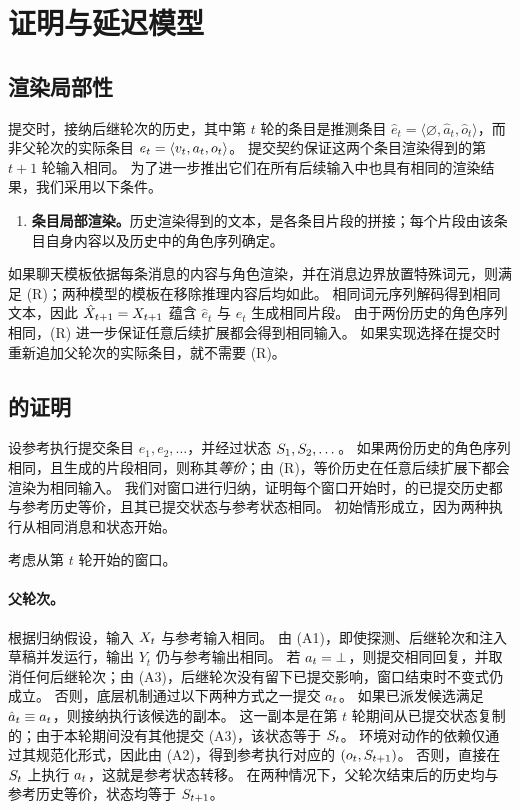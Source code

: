 \section{证明与延迟模型}
\label{app:proofs}

\subsection{渲染局部性}
\label{app:proofs:locality}

提交时，\method 接纳后继轮次的历史，其中第 $t$ 轮的条目是推测条目 $\hat e_t=\langle\varnothing,\hat a_t,\hat o_t\rangle$，而非父轮次的实际条目 $e_t=\langle v_{t},a_{t},o_{t}\rangle$。
提交契约保证这两个条目渲染得到的第 $t{+}1$ 轮输入相同。
为了进一步推出它们在所有后续输入中也具有相同的渲染结果，我们采用以下条件。

\begin{enumerate}[label=(R),leftmargin=*,nosep]
\item \textbf{条目局部渲染。}历史渲染得到的文本，是各条目片段的拼接；每个片段由该条目自身内容以及历史中的角色序列确定。
\end{enumerate}

如果聊天模板依据每条消息的内容与角色渲染，并在消息边界放置特殊词元，则满足 (R)；两种模型的模板在移除推理内容后均如此。
相同词元序列解码得到相同文本，因此 $\hat X_{t+1}=X_{t+1}$ 蕴含 $\hat e_t$ 与 $e_t$ 生成相同片段。
由于两份历史的角色序列相同，(R) 进一步保证任意后续扩展都会得到相同输入。
如果实现选择在提交时重新追加父轮次的实际条目，就不需要 (R)。

\subsection{\texorpdfstring{}{无损性命题}的证明}
\label{app:proofs:lossless}

设参考执行提交条目 $e_1,e_2,\dots$，并经过状态 $S_{1},S_{2},\dots$。
如果两份历史的角色序列相同，且生成的片段相同，则称其\emph{等价}；由 (R)，等价历史在任意后续扩展下都会渲染为相同输入。
我们对窗口进行归纳，证明每个窗口开始时，\method 的已提交历史都与参考历史等价，且其已提交状态与参考状态相同。
初始情形成立，因为两种执行从相同消息和状态开始。

考虑从第 $t$ 轮开始的窗口。

\paragraph{父轮次。}
根据归纳假设，输入 $X_{t}$ 与参考输入相同。
由 (A1)，即使探测、后继轮次和注入草稿并发运行，输出 $Y_t$ 仍与参考输出相同。
若 $a_{t}=\bot$，则提交相同回复，并取消任何后继轮次；由 (A3)，后继轮次没有留下已提交影响，窗口结束时不变式仍成立。
否则，底层机制通过以下两种方式之一提交 $a_{t}$。
如果已派发候选满足 $\hat a_t\equiv a_{t}$，则接纳执行该候选的副本。
这一副本是在第 $t$ 轮期间从已提交状态复制的；由于本轮期间没有其他提交 (A3)，该状态等于 $S_{t}$。
环境对动作的依赖仅通过其规范化形式，因此由 (A2)，得到参考执行对应的 $(o_{t},S_{t+1})$。
否则，直接在 $S_{t}$ 上执行 $a_{t}$，这就是参考状态转移。
在两种情况下，父轮次结束后的历史均与参考历史等价，状态均等于 $S_{t+1}$。

